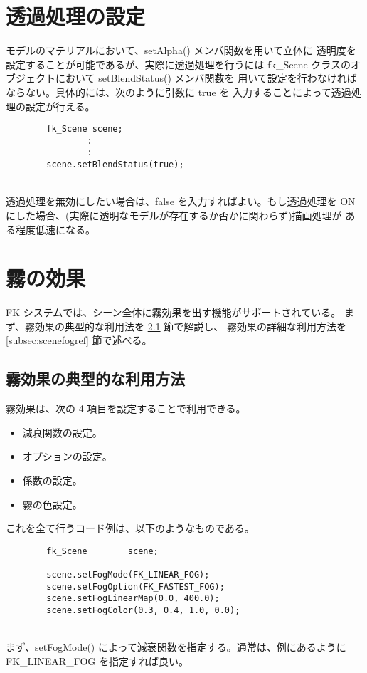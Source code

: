 \section{透過処理の設定} \label{sec:scenetrans}
モデルのマテリアルにおいて、setAlpha() メンバ関数を用いて立体に
透明度を設定することが可能であるが、実際に透過処理を行うには
fk\_Scene クラスのオブジェクトにおいて setBlendStatus() メンバ関数を
用いて設定を行わなければならない。具体的には、次のように引数に true を
入力することによって透過処理の設定が行える。
\\
\begin{screen}
\begin{verbatim}
        fk_Scene scene;
                :
                :
        scene.setBlendStatus(true);
\end{verbatim}
\end{screen}
~ \\
透過処理を無効にしたい場合は、false を入力すればよい。もし透過処理を
ON にした場合、(実際に透明なモデルが存在するか否かに関わらず)描画処理が
ある程度低速になる。

\section{霧の効果}
FK システムでは、シーン全体に霧効果を出す機能がサポートされている。
まず、霧効果の典型的な利用法を \ref{subsec:scenefogintro} 節で解説し、
霧効果の詳細な利用方法を \ref{subsec:scenefogref} 節で述べる。

\subsection{霧効果の典型的な利用方法} \label{subsec:scenefogintro}
霧効果は、次の 4 項目を設定することで利用できる。
\begin{itemize}
 \item 減衰関数の設定。
 \item オプションの設定。
 \item 係数の設定。
 \item 霧の色設定。
\end{itemize}
これを全て行うコード例は、以下のようなものである。
\\
\begin{breakbox}
\begin{verbatim}
        fk_Scene        scene;

        scene.setFogMode(FK_LINEAR_FOG);
        scene.setFogOption(FK_FASTEST_FOG);
        scene.setFogLinearMap(0.0, 400.0);
        scene.setFogColor(0.3, 0.4, 1.0, 0.0);
\end{verbatim}
\end{breakbox}
~ \\
まず、setFogMode() によって減衰関数を指定する。通常は、例にあるように
FK\_LINEAR\_FOG を指定すれば良い。

